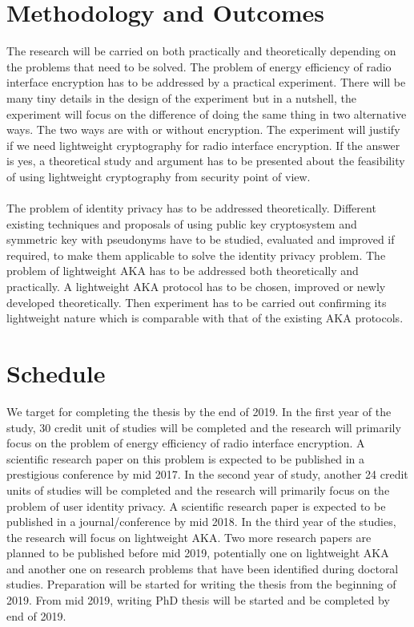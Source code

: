 \documentclass[14pt]{article}
\begin{document}
\begin{enumerate}
\section*{Methodology and Outcomes}
The research will be carried on both practically and theoretically depending on the problems that need to be solved. The problem of energy efficiency of radio interface encryption has to be addressed by a practical experiment. There will be many tiny details in the design of the experiment but in a nutshell, the experiment will focus on the difference of doing the same thing in two alternative ways. The two ways are with or without encryption. The experiment will justify if we need lightweight cryptography for radio interface encryption. If the answer is yes, a theoretical study and argument has to be presented about the feasibility of using lightweight cryptography from security point of view. \paragraph{} The problem of identity privacy has to be addressed theoretically. Different existing techniques and proposals of using public key cryptosystem and symmetric key with pseudonyms have to be studied, evaluated and improved if required, to make them applicable to solve the identity privacy problem. The problem of lightweight AKA has to be addressed both theoretically and practically. A lightweight AKA protocol has to be chosen, improved or newly developed theoretically. Then experiment has to be carried out confirming its lightweight nature which is comparable with that of the existing AKA protocols.


\section*{Schedule}
We target for completing the thesis by the end of 2019. In the first year of the study, 30 credit unit of studies will be completed and the research will primarily focus on the problem of energy efficiency of radio interface encryption. A scientific research paper on this problem is expected to be published in a prestigious conference by mid 2017. In the second year of study, another 24 credit units of studies will be completed and the research will primarily focus on the problem of user identity privacy. A scientific research paper is expected to be published in a journal/conference by mid 2018. In the third year of the studies, the research will focus on lightweight AKA. Two more research papers are planned to be published before mid 2019, potentially one on lightweight AKA and another one on research problems that have been identified during doctoral studies. Preparation will be started for writing the thesis from the beginning of 2019. From mid 2019, writing PhD thesis will be started and be completed by end of 2019.


\end{enumerate}
\end{document}
